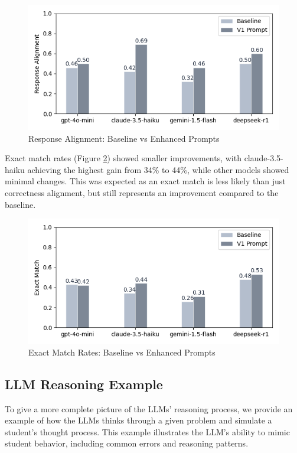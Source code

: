\documentclass[
    a4paper, %
    10pt, %
    twoside, %
]{LTJournalArticle}
\begin{document}
\begin{figure}[H]
    \centering
    \includegraphics[width=\columnwidth]{images/response_alignment_comparison.png}
    \caption{Response Alignment: Baseline vs Enhanced Prompts}
    \label{fig:response-alignment}
\end{figure}

Exact match rates (Figure \ref{fig:exact-match}) showed smaller improvements, with claude-3.5-haiku achieving the highest gain from 34\% to 44\%, while other models showed minimal changes. This was expected as an exact match is less likely than just correctness alignment, but still represents an improvement compared to the baseline.

\begin{figure}[H]
    \centering
    \includegraphics[width=\columnwidth]{images/exact_match_comparison.png}
    \caption{Exact Match Rates: Baseline vs Enhanced Prompts}
    \label{fig:exact-match}
\end{figure}

\subsection{LLM Reasoning Example}

To give a more complete picture of the LLMs' reasoning process, we provide an example of how the LLMs thinks through a given problem and simulate a student's thought process. This example illustrates the LLM's ability to mimic student behavior, including common errors and reasoning patterns.
\end{document}
